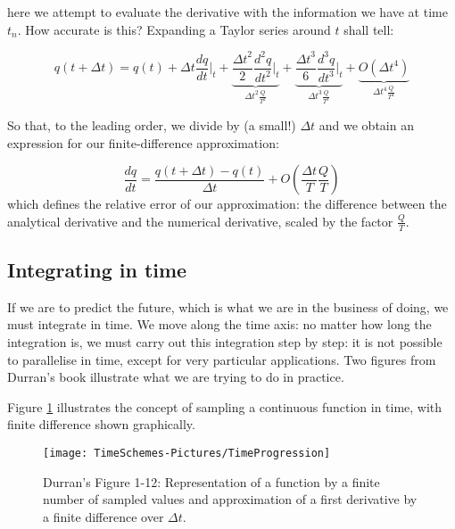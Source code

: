 here we attempt to evaluate the derivative with the information we have at time $t_n$. How accurate is this? Expanding a Taylor series around $t$ shall tell:

\begin{equation}
q(t+\Delta t)=q(t) + \Delta t \frac{dq}{dt}\bigg|_{t} + \underbrace{\frac{{\Delta t}^2}{2} \frac{d^2q}{{dt}^2}\bigg|_{t}}_{{\Delta t}^2 \frac{Q}{T^2}}+ \underbrace{\frac{{\Delta t}^3}{6} \frac{d^3q}{{dt}^3}\bigg|_{t}}_{{\Delta t}^3 \frac{Q}{T^3}} + \underbrace{O({\Delta t}^4)}_{{\Delta t}^4 \frac{Q}{T^4}}
\end{equation}

So that, to the leading order, we divide by (a small!) $ \Delta t$ and we obtain an expression for our finite-difference approximation:

\begin{equation}
\frac{dq}{dt} =  \frac{q(t+\Delta t)-q(t)}{\Delta t} + O(\frac{\Delta t}{T}\frac{Q}{T})
\end{equation}
which defines the relative error of our approximation: the difference between the analytical derivative and the numerical derivative, scaled by the factor $\frac{Q}{T}$.


\subsection{Integrating in time}
If we are to predict the future, which is what we are in the business of doing, we must integrate in time. We move along the time axis: no matter how long the integration is, we must carry out this integration step by step: it is not possible to parallelise in time, except for very particular applications. Two figures from Durran's book illustrate what we are trying to do in practice.

Figure \ref{TimeProgression} illustrates the concept of sampling a continuous function in time, with finite difference shown graphically.

\begin{figure}[h!]
	\texttt{[image: TimeSchemes-Pictures/TimeProgression]}
	\caption{Durran's Figure 1-12: Representation of a function by a finite number of sampled values and approximation of a first derivative by a finite difference over $\Delta t$.}
	\label{TimeProgression}
\end{figure}

